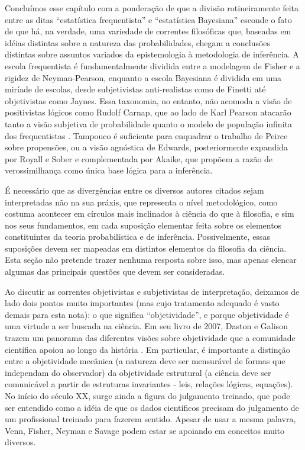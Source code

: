 Concluímos esse capítulo com a ponderação de que a divisão rotineiramente feita entre as ditas ``estatística
frequentista'' e 
``estatística Bayesiana'' esconde o fato de que há, na verdade, uma variedade de correntes filosóficas que, baseadas
em idéias distintas sobre a natureza das probabilidades, chegam a
conclusões distintas sobre assuntos variados da epistemologia 
à metodologia de inferência. A escola frequentista é fundamentalmente dividida entre a modelagem de Fisher e a
rigidez de
Neyman-Pearson, enquanto a escola Bayesiana é dividida em uma miríade de escolas, desde
subjetivistas anti-realistas como de Finetti até objetivistas como Jaynes.
Essa taxonomia, no entanto, não acomoda a visão de positivistas lógicos como Rudolf Carnap, que ao lado de Karl
Pearson atacarão tanto
a visão subjetiva de probabilidade quanto o modelo de população infinita dos frequentistas
\citep{Lenhard06, Zabell09}.
Tampouco é suficiente para enquadrar o trabalho de Peirce sobre propensões, ou a visão agnóstica de Edwards, 
posteriormente expandida por Royall e Sober e complementada por
Akaike, que propõem a razão de verossimilhança como única base lógica para a inferência.

É necessário que as divergências entre os diversos autores citados sejam interpretadas não na sua práxis, que
representa 
o nível metodológico, como costuma acontecer em círculos mais inclinados à ciência do que à filosofia, 
e sim nos seus fundamentos, em cada suposição elementar feita sobre os
elementos constituintes da teoria probabilística e de inferência. Possivelmente, essas suposições devem ser
mapeadas em
distintos elementos da filosofia da ciência. Esta seção não pretende trazer nenhuma resposta sobre isso,
mas apenas elencar algumas das principais questões que devem ser consideradas.

Ao discutir as correntes objetivistas e subjetivistas de interpretação, deixamos de lado dois pontos muito
importantes (mas cujo tratamento adequado é vasto demais para esta nota): o que significa ``objetividade'', e
porque objetividade é uma virtude a ser buscada na ciência. Em seu livro de 2007, Daston e Galison trazem
um panorama das diferentes visões sobre objetividade que a comunidade científica apoiou ao longo da história
\citep{Daston07}. Em particular, é importante a distinção entre a objetividade mecânica (a natureza deve 
ser mensurável de formas que independam do observador) da objetividade estrutural (a ciência deve ser
comunicável a partir de estruturas invariantes - leis, relações lógicas, equações). No início do século XX,
surge ainda a figura do julgamento treinado, que pode ser entendido como a idéia de que os dados científicos
precisam do julgamento de um profissional treinado para fazerem sentido. Apesar de usar a mesma
palavra, Venn, Fisher, Neyman e Savage podem estar se apoiando em conceitos muito diversos.

